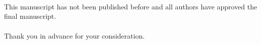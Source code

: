 \documentclass[usebwarms,a4paper,nofold]{damtplet}
\begin{document}
\begin{letter}{}{
		
		\\
		\\\\
		\\
		\\
		\\
		 }
{   \\ \\This manuscript has not been published before and all authors have approved the final manuscript.
   \\\\Thank you in advance for your consideration.
}

\end{letter}
\end{document}
